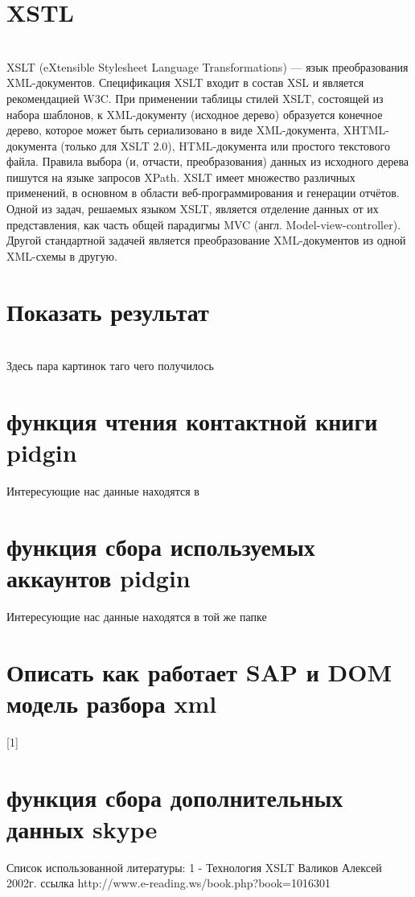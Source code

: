 \chapter*{XSTL}
\\XSLT (eXtensible Stylesheet Language Transformations) — язык преобразования XML-документов. Спецификация XSLT входит в состав XSL и является рекомендацией W3C.
При применении таблицы стилей XSLT, состоящей из набора шаблонов, к XML-документу (исходное дерево) образуется конечное дерево, которое может быть сериализовано в виде XML-документа, XHTML-документа (только для XSLT 2.0), HTML-документа или простого текстового файла. Правила выбора (и, отчасти, преобразования) данных из исходного дерева пишутся на языке запросов XPath.
XSLT имеет множество различных применений, в основном в области веб-программирования и генерации отчётов. Одной из задач, решаемых языком XSLT, является отделение данных от их представления, как часть общей парадигмы MVC (англ. Model-view-controller). Другой стандартной задачей является преобразование XML-документов из одной XML-схемы в другую.
\chapter*{Показать результат}
\\Здесь пара картинок таго чего получилось
\chapter*{функция чтения контактной книги pidgin}
Интересующие нас данные находятся в %
\chapter*{функция сбора используемых аккаунтов pidgin}
Интересующие нас данные находятся в той же папке %
\chapter*{Описать как работает SAP и DOM модель разбора xml}
[1]%
\chapter*{функция сбора дополнительных данных skype}
Список использованной литературы:
1 -  Технология XSLT Валиков Алексей 2002г. ссылка http://www.e-reading.ws/book.php?book=1016301